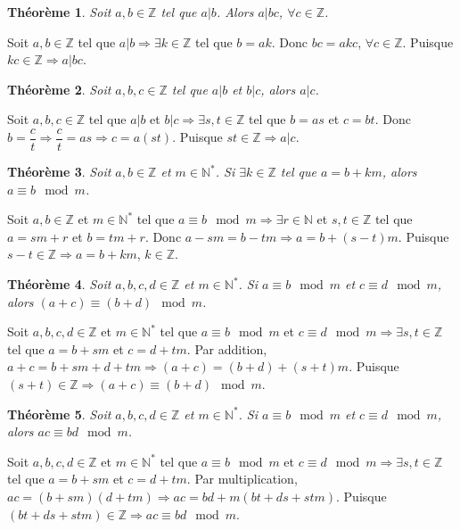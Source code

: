 \documentclass[11pt]{article}
\newtheorem{theorem}{Théorème}
\begin{document}

\begin{theorem}
Soit $a,b\in\mathbb{Z}$ tel que $a|b$. Alors $a|bc$, $\forall c\in\mathbb{Z}$.
\end{theorem}

Soit $a,b\in\mathbb{Z}$ tel que $a|b\Rightarrow\exists k\in\mathbb{Z}$ tel que $b=ak$. Donc $bc=akc$, $\forall c\in\mathbb{Z}$. Puisque $kc\in\mathbb{Z}\Rightarrow a|bc$.

\begin{theorem}
Soit $a,b,c\in\mathbb{Z}$ tel que $a|b$ et $b|c$, alors $a|c$.
\end{theorem}

Soit $a,b,c\in\mathbb{Z}$ tel que $a|b$ et $b|c\Rightarrow\exists s,t\in\mathbb{Z}$ tel que $b=as$ et $c=bt$. Donc $b=\dfrac{c}{t}\Rightarrow\dfrac{c}{t}=as\Rightarrow c=a(st)$. Puisque $st\in\mathbb{Z}\Rightarrow a|c$.

\begin{theorem}
Soit $a,b\in\mathbb{Z}$ et $m\in\mathbb{N^*}$. Si $\exists k\in\mathbb{Z}$ tel que $a=b+km$, alors $a\equiv b\mod m$.
\end{theorem}

Soit $a,b\in\mathbb{Z}$ et $m\in\mathbb{N^*}$ tel que $a\equiv b\mod m\Rightarrow\exists r\in\mathbb{N}$ et $s,t\in\mathbb{Z}$ tel que $a=sm+r$ et $b=tm+r$. Donc $a-sm=b-tm\Rightarrow a=b+(s-t)m$. Puisque $s-t\in\mathbb{Z}\Rightarrow a=b+km$, $k\in\mathbb{Z}$.

\begin{theorem}
Soit $a,b,c,d\in\mathbb{Z}$ et $m\in\mathbb{N^*}$. Si $a\equiv b\mod m$ et $c\equiv d\mod m$, alors $(a+c)\equiv(b+d)\mod m$.
\end{theorem}

Soit $a,b,c,d\in\mathbb{Z}$ et $m\in\mathbb{N^*}$ tel que $a\equiv b\mod m$ et $c\equiv d\mod m\Rightarrow\exists s,t\in\mathbb{Z}$ tel que $a=b+sm$ et $c=d+tm$. Par addition, $a+c=b+sm+d+tm\Rightarrow(a+c)=(b+d)+(s+t)m$. Puisque $(s+t)\in\mathbb{Z}\Rightarrow (a+c)\equiv(b+d)\mod m$.

\begin{theorem}
Soit $a,b,c,d\in\mathbb{Z}$ et $m\in\mathbb{N^*}$. Si $a\equiv b\mod m$ et $c\equiv d\mod m$, alors $ac\equiv bd\mod m$.
\end{theorem}

Soit $a,b,c,d\in\mathbb{Z}$ et $m\in\mathbb{N^*}$ tel que $a\equiv b\mod m$ et $c\equiv d\mod m\Rightarrow\exists s,t\in\mathbb{Z}$ tel que $a=b+sm$ et $c=d+tm$. Par multiplication, $ac=(b+sm)(d+tm)\Rightarrow ac=bd+m(bt+ds+stm)$. Puisque $(bt+ds+stm)\in\mathbb{Z}\Rightarrow ac\equiv bd\mod m$.
\end{document}
